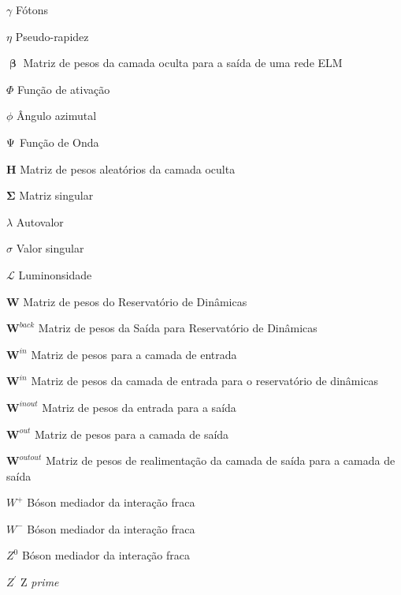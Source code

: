 \begin{simbolos}
	\item[$\gamma$]	Fótons
	\item[$\eta$]	Pseudo-rapidez
	\item[$\boldsymbol{\upbeta}$]	Matriz de pesos da camada oculta para a saída de uma rede ELM
	\item[$\Phi$]	Função de ativação
	\item[$\phi$]	Ângulo azimutal
	\item[$\mathbf\mathrm{\Psi}$] Função de Onda
	\item[$\mathbf{H}$]	Matriz de pesos aleatórios da camada oculta
	\item[$\mathbf{\Sigma}$] Matriz singular
	\item[$\lambda$]	Autovalor
	\item[$\sigma$]	Valor singular
	\item[$\mathcal{L}$]	Luminonsidade
	\item[$\mathbf{W}$]	Matriz de pesos do Reservatório de Dinâmicas
	\item[$\mathbf{W}^{back}$]	Matriz de pesos da Saída para Reservatório de Dinâmicas
	\item[$\mathbf{W}^{in}$]	Matriz de pesos para a camada de entrada
	\item[$\mathbf{W}^{in}$]	Matriz de pesos da camada de entrada para o reservatório de dinâmicas
	\item[$\mathbf{W}^{inout}$]	Matriz de pesos da entrada para a saída
	\item[$\mathbf{W}^{out}$]	Matriz de pesos para a camada de saída
	\item[$\mathbf{W}^{outout}$]	Matriz de pesos de realimentação da camada de saída para a camada de saída
	\item[$W^{+}$]	Bóson mediador da interação fraca
	\item[$W^{-}$]	Bóson mediador da interação fraca
	\item[$Z^{0}$]	Bóson mediador da interação fraca
	\item[$Z^{'}$]	Z \textit{prime}
\end{simbolos}

